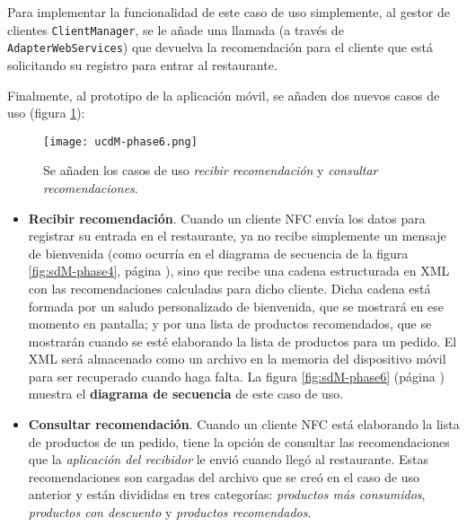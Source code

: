 Para implementar la funcionalidad de este caso de uso simplemente, al gestor de 
clientes \texttt{ClientManager}, se le añade una llamada (a través de
\texttt{AdapterWebServices}) que devuelva la recomendación para el cliente
que está solicitando su registro para entrar al restaurante.

Finalmente, al prototipo de la aplicación móvil, se añaden dos nuevos casos de 
uso (figura \ref{fig:ucdM-phase6}):

  \begin{figure}[H]
    \begin{center}
      \texttt{[image: ucdM-phase6.png]}
      \caption{Se añaden los casos de uso \emph{recibir recomendación} y
      \emph{consultar recomendaciones}.}
      \label{fig:ucdM-phase6}
    \end{center}
  \end{figure}

\begin{itemize}

\item \textbf{Recibir recomendación}. Cuando un cliente \acs{NFC} envía los
datos para registrar su entrada en el restaurante, ya no recibe simplemente
un mensaje de bienvenida (como ocurría en el diagrama de secuencia de la
figura \ref{fig:sdM-phase4}, página \pageref{fig:sdM-phase4}), sino que
recibe una cadena estructurada en \acs{XML} con las recomendaciones calculadas
para dicho cliente. Dicha cadena está formada por un saludo personalizado
de bienvenida, que se mostrará en ese momento en pantalla; y por una lista
de productos recomendados, que se mostrarán cuando se esté elaborando la lista 
de productos para un pedido. El \acs{XML} será almacenado como un archivo en la 
memoria del dispositivo móvil para ser recuperado cuando haga falta.
La figura \ref{fig:sdM-phase6} (página \pageref{fig:sdM-phase6}) muestra el 
\textbf{diagrama de secuencia} de este caso de uso.

\item \textbf{Consultar recomendación}. Cuando un cliente \acs{NFC} está
elaborando la lista de productos de un pedido, tiene la opción de consultar
las recomendaciones que la \emph{aplicación del recibidor} le envió cuando
llegó al restaurante. Estas recomendaciones son cargadas del archivo que se
creó en el caso de uso anterior y están divididas en tres categorías:
\emph{productos más consumidos}, \emph{productos con descuento} y
\emph{productos recomendados}.
\end{itemize}

